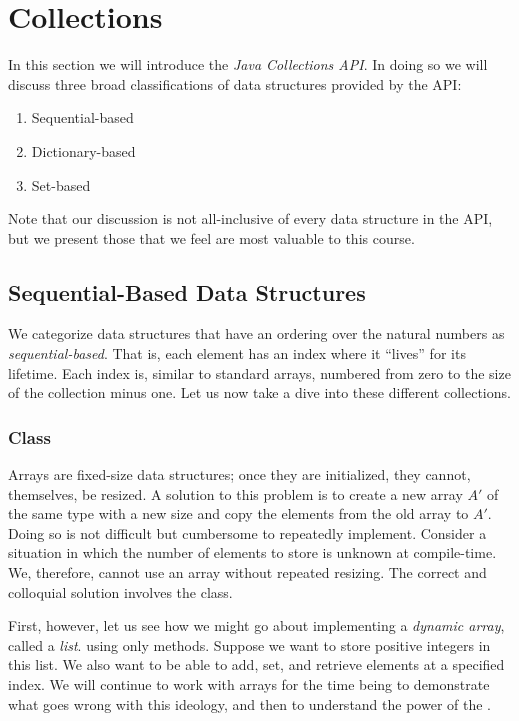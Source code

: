 \section{Collections}

In this section we will introduce the \textit{Java Collections API}. In doing so we will discuss three broad classifications of data structures provided by the API:
\begin{enumerate}
    \item Sequential-based
    \item Dictionary-based
    \item Set-based
\end{enumerate}
Note that our discussion is not all-inclusive of every data structure in the API, but we present those that we feel are most valuable to this course.

\subsection*{Sequential-Based Data Structures}
We categorize data structures that have an ordering over the natural numbers as \textit{sequential-based}. That is, each element has an index where it ``lives'' for its lifetime. Each index is, similar to standard arrays, numbered from zero to the size of the collection minus one. Let us now take a dive into these different collections.
\subsubsection*{ Class}
Arrays are fixed-size data structures; once they are initialized, they cannot, themselves, be resized. A solution to this problem is to create a new array $A'$ of the same type with a new size and copy the elements from the old array to $A'$. Doing so is not difficult but cumbersome to repeatedly implement. Consider a situation in which the number of elements to store is unknown at compile-time. We, therefore, cannot use an array without repeated resizing. The correct and colloquial solution involves the  class.

First, however, let us see how we might go about implementing a \textit{dynamic array}, called a \textit{list}. using only methods. Suppose we want to store positive integers in this list. We also want to be able to add, set, and retrieve elements at a specified index. We will continue to work with arrays for the time being to demonstrate what goes wrong with this ideology, and then to understand the power of the .


